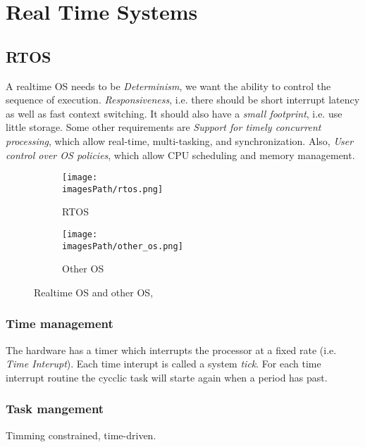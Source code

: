 \chapter{Real Time Systems}

\newpage
\section{RTOS}
A realtime OS needs to be \textit{Determinism}, we want the ability to control
the sequence of execution. \textit{Responsiveness}, i.e. there should be short
interrupt latency as well as fast context switching. It should also have a \textit{small
footprint}, i.e. use little storage. Some other requirements are \textit{Support for timely concurrent processing}, 
which allow real-time, multi-tasking, and synchronization. Also, \textit{User control over OS policies}, 
which allow CPU scheduling and memory management.

\begin{figure}[H]
\centering
\begin{subfigure}{.5\textwidth}
  \centering
  \texttt{[image: \\imagesPath/rtos.png]}
  \caption{RTOS}
  \label{fig:rtos}
\end{subfigure}%
\begin{subfigure}{.5\textwidth}
  \centering
  \texttt{[image: \\imagesPath/other\_os.png]}
  \caption{Other OS}
  \label{fig:other_os}
\end{subfigure}
\caption{Realtime OS and other OS, \cite{RTOS, l2, p6}}
\label{fig:test}
\end{figure}

\subsection{Time management}
The hardware has a timer which interrupts the processor at a fixed rate (i.e. \textit{Time Interupt}). Each time interupt is called a system \textit{tick}.
For each time interrupt routine the cycclic task will starte again when a period has past.

\subsection{Task mangement}
Timming constrained, time-driven.

